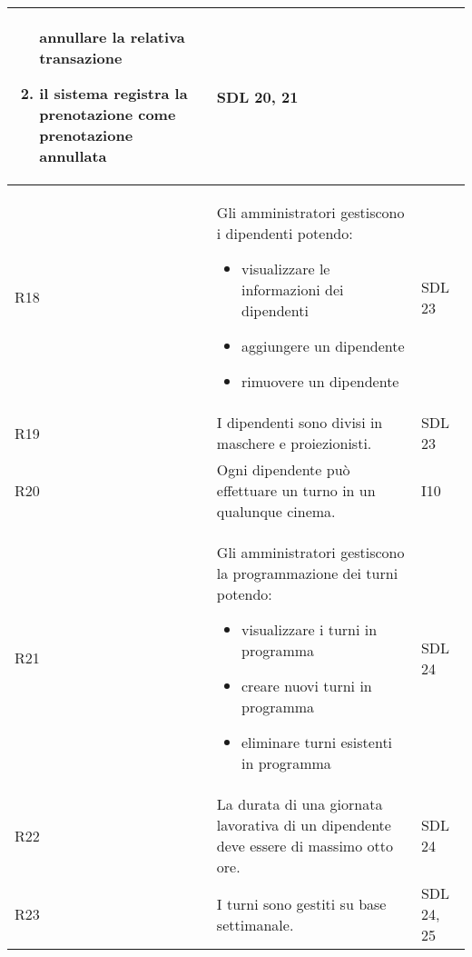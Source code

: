 \begin{longtable}{|p{0.8cm}|p{13.4cm}|p{2.1cm}|}
\begin{enumerate}
                  annullare la relativa transazione
            \item il sistema registra la prenotazione come prenotazione
                  annullata
      \end{enumerate}             &
      SDL 20, 21
      \\\hline
      R18                                                                     &
      Gli amministratori gestiscono i dipendenti potendo:
      \begin{itemize}
            \item visualizzare le informazioni dei dipendenti
            \item aggiungere un dipendente
            \item rimuovere un dipendente
      \end{itemize}                       &
      SDL 23
      \\\hline
      R19                                                                     &
      I dipendenti sono divisi in maschere e proiezionisti.                   &
      SDL 23
      \\\hline
      R20                                                                     &
      Ogni dipendente può effettuare un turno in un qualunque cinema.         &
      I10
      \\\hline
      R21                                                                     &
      Gli amministratori gestiscono la programmazione dei turni
      potendo:
      \begin{itemize}
            \item visualizzare i turni in programma
            \item creare nuovi turni in programma
            \item eliminare turni esistenti in programma
      \end{itemize}                            &
      SDL 24
      \\\hline
      R22                                                                     &
      La durata di una giornata lavorativa di un dipendente deve essere di
      massimo otto ore.                                                       &
      SDL 24
      \\\hline
      R23                                                                     &
      I turni sono gestiti su base settimanale.                               &
      SDL 24, 25
      \\\hline

\end{longtable}
